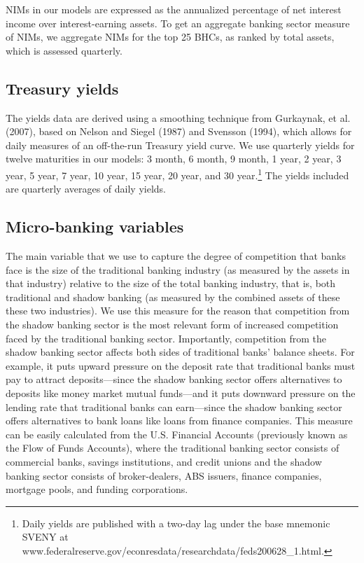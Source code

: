 \documentclass[11pt]{article}
\renewcommand{\baselinestretch}{1.5}
\begin{document}
NIMs in our models are expressed as the annualized percentage of net interest income over interest-earning assets. To get an aggregate banking sector measure of NIMs, we aggregate NIMs for the top 25 BHCs, as ranked by total assets, which is assessed quarterly. 

\subsection{Treasury yields}

The yields data are derived using a smoothing technique from Gurkaynak, et al. (2007), based on Nelson and Siegel (1987) and Svensson (1994), which allows for daily measures of an off-the-run Treasury yield curve. We use quarterly yields for twelve maturities in our models: 3 month, 6 month, 9 month, 1 year, 2 year, 3 year, 5 year, 7 year, 10 year, 15 year, 20 year, and 30 year.\renewcommand{\baselinestretch}{1.0}\footnote{Daily yields are published with a two-day lag under the base mnemonic SVENY at  www.federalreserve.gov/econresdata/researchdata/feds200628\_1.html.\vspace{0.05in}}\renewcommand{\baselinestretch}{1.5} The yields included are quarterly averages of daily yields. 

\subsection{Micro-banking variables}

\vspace{-0.1in} The main variable that we use to capture the degree of competition that banks face is the size of the traditional
banking industry (as measured by the assets in that industry) relative to the size of the total banking industry, that is, both
traditional and shadow banking (as measured by the combined assets of these these two industries). We use this measure for the
reason that competition from the shadow banking sector is the most relevant form of increased competition faced by the
traditional banking sector.  Importantly, competition from the shadow banking sector affects both sides of traditional banks'
balance sheets. For example, it puts upward pressure on the deposit rate that traditional banks must pay to attract deposits---since the shadow banking sector offers alternatives to deposits like money market mutual funds---and it puts downward pressure on the lending rate that traditional banks can earn---since the shadow banking sector offers alternatives to bank loans like loans from finance companies. This measure can be easily calculated from the U.S. Financial Accounts (previously known as the Flow of Funds Accounts), where the traditional banking sector consists of commercial banks, savings institutions, and credit unions and the shadow banking sector consists of broker-dealers, ABS issuers, finance companies, mortgage pools, and funding corporations.
\end{document}
